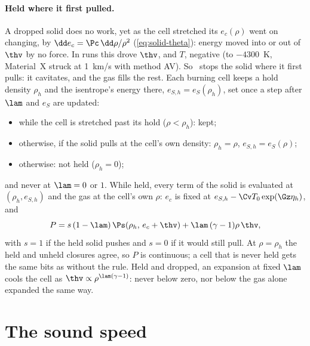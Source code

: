 \paragraph{Held where it first pulled.} A dropped solid does no work, yet as
the cell stretched its $e_c(\rho)$ went on changing, by
$\dd e_c = \Pc\,\dd\rho/\rho^2$ (\cref{eq:solid-theta}): energy moved into or
out of $\thv$ by no force. In runs this drove $\thv$, and $T$, negative
(to $-4300$~K, Material~X struck at 1~km/s with method AV). So \bw\ stops
the solid where it first pulls: it cavitates, and the gas fills the rest.
Each burning cell keeps a hold density $\rho_h$ and the isentrope's energy
there, $e_{S,h} = e_S(\rho_h)$, set once a step after $\lam$ and $e_S$ are
updated:
\begin{itemize}
\item while the cell is stretched past its hold ($\rho < \rho_h$): kept;
\item otherwise, if the solid pulls at the cell's own density: $\rho_h =
  \rho$, $e_{S,h} = e_S(\rho)$;
\item otherwise: not held ($\rho_h = 0$);
\end{itemize}
and never at $\lam = 0$ or $1$. While held, every term of the solid is
evaluated at $(\rho_h, e_{S,h})$ and the gas at the cell's own $\rho$:
$e_c$ is fixed at $e_{S,h} - \Cv T_0\exp(\Gz\eta_h)$, and
\begin{equation}
  P = s\,(1 - \lam)\,\Ps(\rho_h,\, e_c + \thv) + \lam\,(\gamma - 1)\rho\,\thv,
  \label{eq:held}
\end{equation}
with $s = 1$ if the held solid pushes and $s = 0$ if it would still pull.
At $\rho = \rho_h$ the held and unheld closures agree, so $P$ is
continuous; a cell that is never held gets the same bits as without the
rule. Held and dropped, an expansion at fixed $\lam$ cools the cell as
$\thv \propto \rho^{\lam(\gamma - 1)}$: never below zero, nor below the gas
alone expanded the same way.

\section{The sound speed}
\label{sec:sound-speed}

